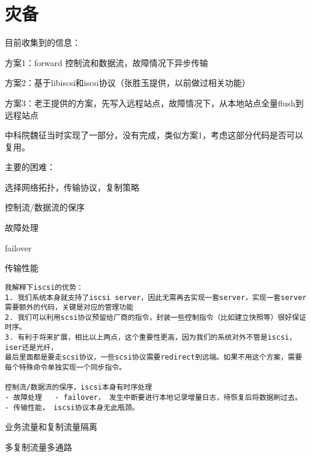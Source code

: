 \chapter{灾备}

目前收集到的信息：

\begin{compactenum}
\item 方案1：forward 控制流和数据流，故障情况下异步传输
\item 方案2：基于libiscsi和iscsi协议（张胜玉提供，以前做过相关功能）
\item 方案3：老王提供的方案，先写入远程站点，故障情况下，从本地站点全量flush到远程站点
\end{compactenum}

中科院魏征当时实现了一部分，没有完成，类似方案1，考虑这部分代码是否可以复用。

主要的困难：
\begin{compactenum}
\item 选择网络拓扑，传输协议，复制策略
\item 控制流/数据流的保序
\item 故障处理
\item failover
\item 传输性能
\end{compactenum}

\begin{lstlisting}
我解释下iscsi的优势：
1. 我们系统本身就支持了iscsi server，因此无需再去实现一套server，实现一套server需要额外的代码，关键是对应的管理功能
2. 我们可以利用scsi协议预留给厂商的指令，封装一些控制指令（比如建立快照等）很好保证时序。
3. 有利于将来扩展，相比以上两点，这个重要性更高，因为我们的系统对外不管是iscsi，iser还是光纤，
最后里面都是要走scsi协议，一些scsi协议需要redirect到远端。如果不用这个方案，需要每个特殊命令单独实现一个同步指令。

控制流/数据流的保序，iscsi本身有时序处理
- 故障处理   - failover， 发生中断要进行本地记录增量日志，待恢复后将数据刷过去。
- 传输性能， iscsi协议本身无此瓶颈。
\end{lstlisting}

业务流量和复制流量隔离

多复制流量多通路
